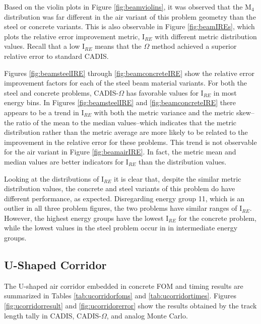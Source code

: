 Based on the violin plots in Figure \ref{fig:beamviolins}, it was observed that
the M$_4$ distribution was far different in the air variant of this problem
geometry than the steel or concrete variants. This is also observable in Figure
\ref{fig:beamIREs}, which plots the relative error improvement metric, I$_{RE}$
with different metric distribution values. Recall that a low I$_{RE}$ means that
the $\Omega$ method achieved a superior relative error to standard CADIS.

Figures \ref{fig:beamsteelIRE} through \ref{fig:beamconcreteIRE} show the
relative error improvement factors for each of the steel beam material variants. 
For both the steel and concrete problems,
CADIS-$\Omega$ has favorable values for I$_{RE}$ in most energy bins. In Figures
\ref{fig:beamsteelIRE} and \ref{fig:beamconcreteIRE} there appears to be a trend
in I$_{RE}$ with both the metric variance and the metric skew--the ratio of the
mean to the median values--which indicates that the metric distribution rather
than the metric average are more likely to be related to the improvement in the
relative error for these problems. This trend is not observable for the air
variant in Figure \ref{fig:beamairIRE}. In fact, the metric mean and median
values are better indicators for I$_{RE}$ than the distribution values.

Looking at the distributions of I$_{RE}$ it is clear that, despite the similar
metric distribution values, the concrete and steel variants of this problem do
have different performance, as expected. Disregarding energy group 11, which is an outlier
in all three problem figures, 
the two problems have similar ranges of I$_{RE}$.
However, the highest energy groups have the lowest I$_{RE}$ for the concrete
problem, while the lowest values in the steel problem occur in in intermediate
energy groups.


\subsection{U-Shaped Corridor}
\label{subsec:resultsucorridor}

The U-shaped air corridor embedded in concrete
FOM and timing
results are summarized in Tables
\ref{tab:ucorridorfoms} and \ref{tab:ucorridortimes}. Figures
\ref{fig:ucorridorresult} and \ref{fig:ucorridorerror} show the results obtained
by the track length tally in CADIS, CADIS-$\Omega$, and analog
Monte Carlo.

